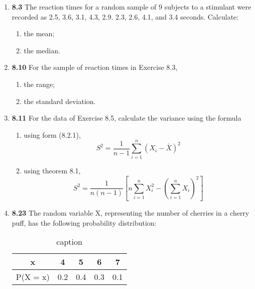 \documentclass[basic, header]{nosvagor-notes}
\begin{document}
\begin{enumerate}[itemsep=4em]
  \item \textbf{8.3} The reaction times for a random sample of 9 subjects to a
    stimulant were recorded as 2.5, 3.6, 3.1, 4.3, 2.9. 2.3, 2.6, 4.1, and 3.4
    seconds. Calculate:
    \begin{enumerate}

      \item the mean;
      \item the median.

    \end{enumerate}

  \item \textbf{8.10} For the sample of reaction times in Exercise 8.3,
    \begin{enumerate}

      \item the range;
      \item the standard deviation.

    \end{enumerate}

  \item \textbf{8.11} For the data of Exercise 8.5, calculate the variance using the formula
    \begin{enumerate}

      \item using form (8.2.1),
        \[%
            S^2 = \frac{1}{n-1} \sum_{i=1}^{n} \left( X_i - \bar{X} \right)^2
        \]%

      \item using theorem 8.1,
        \[%
            S^2 = \frac{1}{n(n-1)} \left[ n \sum_{i=1}^{n} X_i^2 - \left( \sum_{i=1}^{n} X_i \right)^2  \right]
        \]%

    \end{enumerate}

  \newpage %

  \item \textbf{8.23} The random variable X, representing the number of cherries in a
    cherry puff, has the following probability distribution:
    \begin{table}[h]
      \centering
      \caption{caption}
      \begin{tabular}{c|cccc}
        x & 4 & 5 & 6 & 7 \\
        \midrule
        P(X = x) & 0.2 & 0.4 & 0.3 & 0.1 \\
      \end{tabular}
    \end{table}
    \begin{enumerate}


\end{enumerate}
\end{enumerate}
\end{document}
